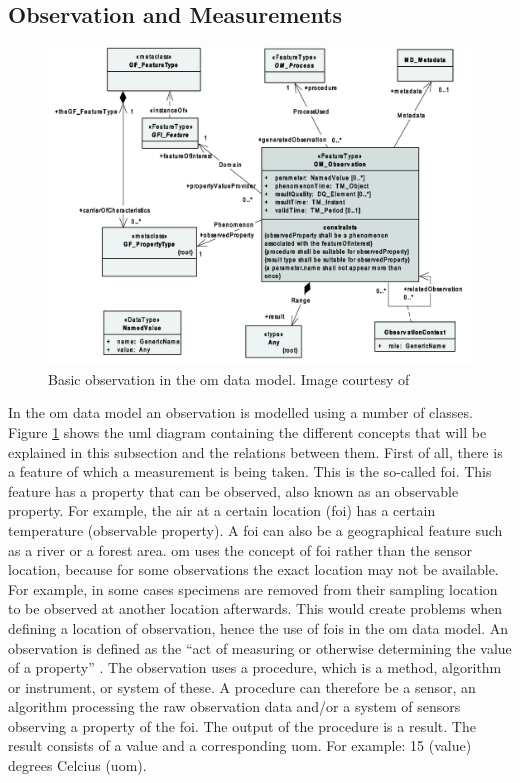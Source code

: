 \subsection{Observation and Measurements}

\begin{figure}
	\centering
	\includegraphics[width=0.8\linewidth]{UML/OM_Observation.png}
	\caption{Basic observation in the \ac{om} data model. Image courtesy of \cite[p. 9]{SW:ISO}}
	\label{fig:OM_observation}
\end{figure}

In the \acf{om} data model an observation is modelled using a number of classes. Figure \ref{fig:OM_observation} shows the \ac{uml} diagram containing the different concepts that will be explained in this subsection and the relations between them. First of all, there is a feature of which a measurement is being taken. This is the so-called \acf{foi}. This feature has a property that can be observed, also known as an observable property. For example, the air at a certain location (\ac{foi}) has a certain temperature (observable property). A \ac{foi} can also be a geographical feature such as a river or a forest area. \ac{om} uses the concept of \ac{foi} rather than the sensor location, because for some observations the exact location may not be available. For example, in some cases specimens are removed from their sampling location to be observed at another location afterwards. This would create problems when defining a location of observation, hence the use of \aclp{foi} in the \ac{om} data model. An observation is defined as the \enquote{act of measuring or otherwise determining the value of a property} \citep[p. 3]{SW:ISO}. The observation uses a procedure, which is a method, algorithm or instrument, or system of these. A procedure can therefore be a sensor, an algorithm processing the raw observation data and/or a system of sensors observing a property of the \ac{foi}. The output of the procedure is a result. The result consists of a value and a corresponding \acf{uom}. For example: 15 (value) degrees Celcius (\ac{uom}). 

